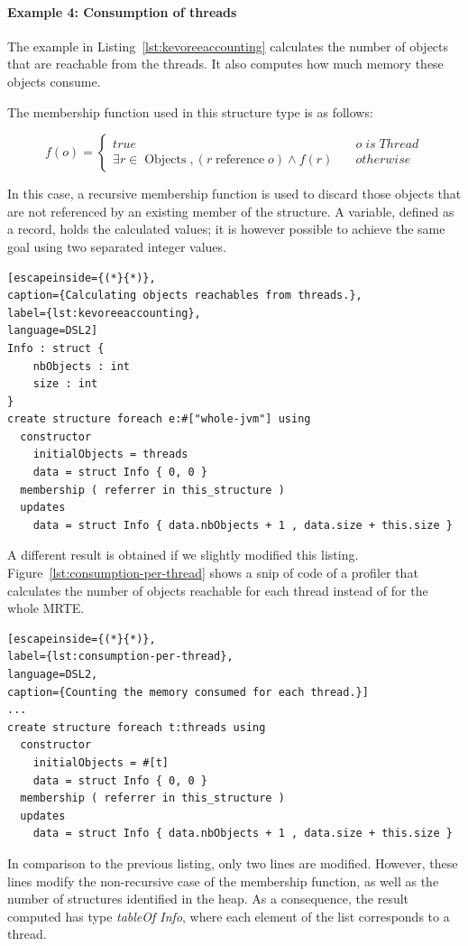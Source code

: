 \paragraph{Example 4: Consumption of threads}
The example in Listing~\ref{lst:kevoreeaccounting} calculates the number of objects that are reachable from the threads.
It also computes how much memory these objects consume.

The membership function used in this structure type is as follows:

\[
	f\left( o \right) = \begin{cases}
	true & \quad o \; is \; Thread \\
	\exists {r \in \operatorname{Objects}}, (r \operatorname{reference} o) \wedge f(r)  & \quad otherwise
	\end{cases}
\] 

In this case, a recursive membership function is used to discard those objects that are not referenced by an existing member of the structure.
A variable, defined as a record, holds the  calculated values; it is however possible to achieve the same goal using two separated integer values.

\begin{lstlisting}[escapeinside={(*}{*)},
caption={Calculating objects reachables from threads.},
label={lst:kevoreeaccounting},
language=DSL2]
Info : struct {
	nbObjects : int
	size : int	
}
create structure foreach e:#["whole-jvm"] using
  constructor
    initialObjects = threads
    data = struct Info { 0, 0 }
  membership ( referrer in this_structure )
  updates 
	data = struct Info { data.nbObjects + 1 , data.size + this.size }
\end{lstlisting}

A different result is obtained if we slightly modified this listing.
Figure~\ref{lst:consumption-per-thread} shows a snip of code of a profiler that calculates the number of objects reachable for each thread instead of for the whole MRTE.
\begin{lstlisting}[escapeinside={(*}{*)},
label={lst:consumption-per-thread},
language=DSL2,
caption={Counting the memory consumed for each thread.}]
...
create structure foreach t:threads using
  constructor
    initialObjects = #[t]
    data = struct Info { 0, 0 }
  membership ( referrer in this_structure )
  updates 
	data = struct Info { data.nbObjects + 1 , data.size + this.size }
\end{lstlisting}

In comparison to the previous listing, only two lines are modified.
However, these lines modify the non-recursive case of the membership function, as well as the number of structures identified in the heap.
As a consequence, the result computed has type \textit{tableOf Info}, where each element of the list corresponds to a thread.

